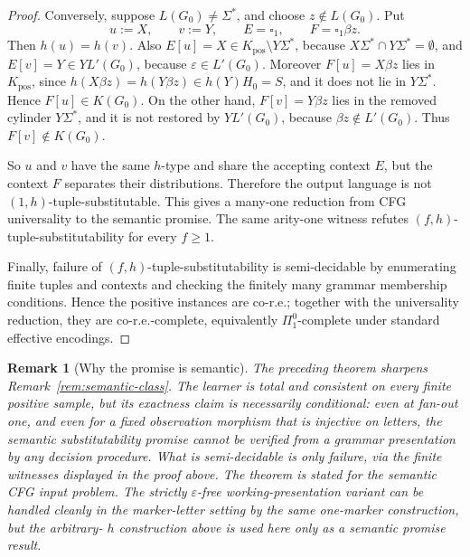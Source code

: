 \documentclass[11pt,a4paper]{article}
\newtheorem{remark}[theorem]{Remark}
\theoremstyle{remark}
\newcommand{\blank}{\square}
\newcommand{\eps}{\varepsilon}
\begin{document}
\begin{proof}
Conversely, suppose \(L(G_0)\ne\Sigma^*\), and choose \(z\notin L(G_0)\).  Put
\[
  u:=X,
  \qquad v:=Y,
  \qquad E=\blank_1,
  \qquad F=\blank_1\beta z .
\]
Then \(h(u)=h(v)\).  Also \(E[u]=X\in K_{\mathrm{pos}}\setminus Y\Sigma^*\),
because \(X\Sigma^*\cap Y\Sigma^*=\emptyset\), and
\(E[v]=Y\in YL'(G_0)\), because \(\eps\in L'(G_0)\).  Moreover
\(F[u]=X\beta z\) lies in \(K_{\mathrm{pos}}\), since
\(h(X\beta z)=h(Y\beta z)\in h(Y)H_0=S\), and it does not lie in
\(Y\Sigma^*\).  Hence \(F[u]\in K(G_0)\).  On the other hand,
\(F[v]=Y\beta z\) lies in the removed cylinder \(Y\Sigma^*\), and it is not
restored by \(YL'(G_0)\), because \(\beta z\notin L'(G_0)\).  Thus
\(F[v]\notin K(G_0)\).

So \(u\) and \(v\) have the same \(h\)-type and share the accepting context
\(E\), but the context \(F\) separates their distributions.  Therefore the
output language is not \((1,h)\)-tuple-substitutable.  This gives a many-one
reduction from CFG universality to the semantic promise.  The same arity-one
witness refutes \((f,h)\)-tuple-substitutability for every \(f\ge1\).

Finally, failure of \((f,h)\)-tuple-substitutability is semi-decidable by
enumerating finite tuples and contexts and checking the finitely many grammar
membership conditions.  Hence the positive instances are co-r.e.; together
with the universality reduction, they are co-r.e.-complete, equivalently
\(\Pi^0_1\)-complete under standard effective encodings.
\end{proof}

\begin{remark}[Why the promise is semantic]
\label{rem:promise-undecidable}
The preceding theorem sharpens Remark~\ref{rem:semantic-class}.  The learner is
total and consistent on every finite positive sample, but its exactness claim is
necessarily conditional: even at fan-out one, and even for a fixed observation
morphism that is injective on letters, the semantic substitutability promise
cannot be verified from a grammar presentation by any decision procedure.  What
is semi-decidable is only failure, via the finite witnesses displayed in the
proof above.  The theorem is stated for the semantic CFG input problem.  The strictly
\(\eps\)-free working-presentation variant can be handled cleanly in the
marker-letter setting by the same one-marker construction, but the arbitrary-
\(h\) construction above is used here only as a semantic promise result.
\end{remark}
\end{document}
